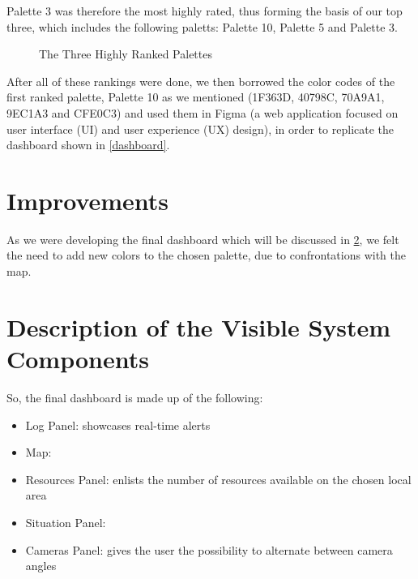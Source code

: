 Palette 3 was therefore the most highly rated, thus 
forming the basis of our top three, which includes the 
following paletts: Palette 10, Palette 5 and Palette 3.
\begin{figure}[H]
    \centerline{%
    \hfill
    \hfill
    }
    \caption{The Three Highly Ranked Palettes}
\end{figure} 
After all of these rankings were done, we then borrowed the 
color codes of the first ranked palette, Palette 10 as we mentioned 
(1F363D, 40798C, 70A9A1, 9EC1A3 and CFE0C3) and used them 
in Figma (a web application focused on user interface 
(UI) and user experience (UX) design), in order to replicate 
the dashboard shown in \ref{dashboard}.
\section{Improvements}
As we were developing the final dashboard which will be 
discussed in \ref{description}, we felt the need to add 
new colors to the chosen palette, due to confrontations with 
the map.
\section{Description of the Visible System Components} \label{description}
So, the final dashboard is made up of the following: 
\begin{itemize}
    \item Log Panel: showcases real-time alerts
    \item Map: 
    \item Resources Panel: enlists the number of resources 
    available on the chosen local area
    \item Situation Panel:
    \item Cameras Panel: gives the user the possibility 
    to alternate between camera angles
\end{itemize}